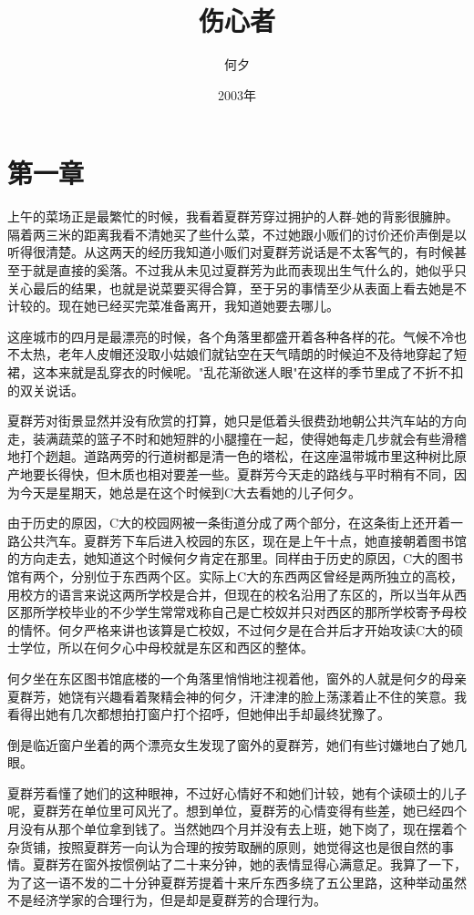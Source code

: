 \documentclass[UTF8]{ctexart}
\title{伤心者}
\author{何夕}
\date{2003年}
\begin{document}
\large

\maketitle
\section*{第一章}
    上午的菜场正是最繁忙的时候，我看着夏群芳穿过拥护的人群-她的背影很臃肿。隔着两三米的距离我看不清她买了些什么菜，不过她跟小贩们的讨价还价声倒是以听得很清楚。从这两天的经历我知道小贩们对夏群芳说话是不太客气的，有时候甚至于就是直接的奚落。不过我从未见过夏群芳为此而表现出生气什么的，她似乎只关心最后的结果，也就是说菜要买得合算，至于另的事情至少从表面上看去她是不计较的。现在她已经买完菜准备离开，我知道她要去哪儿。
    
    这座城市的四月是最漂亮的时候，各个角落里都盛开着各种各样的花。气候不冷也不太热，老年人皮帽还没取小姑娘们就钻空在天气晴朗的时候迫不及待地穿起了短裙，这本来就是乱穿衣的时候呢。"乱花渐欲迷人眼"在这样的季节里成了不折不扣的双关说话。
    
    夏群芳对街景显然并没有欣赏的打算，她只是低着头很费劲地朝公共汽车站的方向走，装满蔬菜的篮子不时和她短胖的小腿撞在一起，使得她每走几步就会有些滑稽地打个趔趄。道路两旁的行道树都是清一色的塔松，在这座温带城市里这种树比原产地要长得快，但木质也相对要差一些。夏群芳今天走的路线与平时稍有不同，因为今天是星期天，她总是在这个时候到C大去看她的儿子何夕。
    
    由于历史的原因，C大的校园网被一条街道分成了两个部分，在这条街上还开着一路公共汽车。夏群芳下车后进入校园的东区，现在是上午十点，她直接朝着图书馆的方向走去，她知道这个时候何夕肯定在那里。同样由于历史的原因，C大的图书馆有两个，分别位于东西两个区。实际上C大的东西两区曾经是两所独立的高校，用校方的语言来说这两所学校是合并，但现在的校名沿用了东区的，所以当年从西区那所学校毕业的不少学生常常戏称自己是亡校奴并只对西区的那所学校寄予母校的情怀。何夕严格来讲也该算是亡校奴，不过何夕是在合并后才开始攻读C大的硕士学位，所以在何夕心中母校就是东区和西区的整体。
    
    何夕坐在东区图书馆底楼的一个角落里悄悄地注视着他，窗外的人就是何夕的母亲夏群芳，她饶有兴趣看着聚精会神的何夕，汗津津的脸上荡漾着止不住的笑意。我看得出她有几次都想拍打窗户打个招呼，但她伸出手却最终犹豫了。
    
    倒是临近窗户坐着的两个漂亮女生发现了窗外的夏群芳，她们有些讨嫌地白了她几眼。
    
    夏群芳看懂了她们的这种眼神，不过好心情好不和她们计较，她有个读硕士的儿子呢，夏群芳在单位里可风光了。想到单位，夏群芳的心情变得有些差，她已经四个月没有从那个单位拿到钱了。当然她四个月并没有去上班，她下岗了，现在摆着个杂货铺，按照夏群芳一向认为合理的按劳取酬的原则，她觉得这也是很自然的事情。夏群芳在窗外按惯例站了二十来分钟，她的表情显得心满意足。我算了一下，为了这一语不发的二十分钟夏群芳提着十来斤东西多绕了五公里路，这种举动虽然不是经济学家的合理行为，但是却是夏群芳的合理行为。
    
\end{document}
